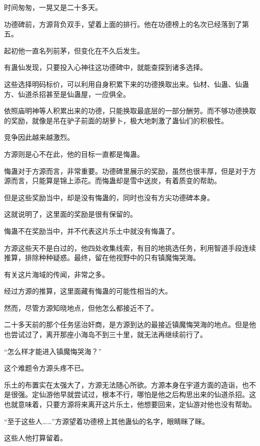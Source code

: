 
\begin{this_body}

时间匆匆，一晃又是二十多天。

功德碑前，方源背负双手，望着上面的排行。他在功德榜上的名次已经落到了第五。

起初他一直名列前茅，但变化在不久后发生。

有蛊仙发现，只要投入心神往这功德碑中，就能查探到诸多选择。

这些选择明码标价，可以利用自身积累下来的功德换取出来。仙材、仙蛊、仙蛊方、仙道杀招甚至是仙蛊屋，一应俱全。

依照庙明神等人积累出来的功德，只能换取最底层的一部分酬劳。而不够功德换取的奖励，就像是吊在驴子前面的胡萝卜，极大地刺激了蛊仙们的积极性。

竞争因此越来越激烈。

方源则是心不在此，他的目标一直都是悔蛊。

悔蛊对于方源而言，非常重要。功德碑里展示的奖励，虽然也很丰厚，但是对于方源而言，只能算是锦上添花。而悔蛊却是雪中送炭，有着质变的帮助。

但是这些奖励当中，却是没有悔蛊的，同时也没有方尖功德碑本身。

这就说明了，这里面的奖励是很有保留的。

悔蛊不在奖励当中，并不代表这片乐土中就没有悔蛊了。

方源这些天不是白过的，他四处收集线索，有目的地挑选任务，利用智道手段连续推算，排除种种疑惑。最终，留在他视野中的只有镇魔悔哭海。

有关这片海域的传闻，非常之多。

经过方源的推算，这里面藏有悔蛊的可能性相当的大。

然而，尽管方源知晓地点，但他怎么都接近不了。

二十多天前的那个任务惩治奸商，是方源到达的最接近镇魔悔哭海的地点。但是他也尝试过了，离开那座小海岛不到三十里，就无法再继续前行了。

“怎么样才能进入镇魔悔哭海？”

这个难题令方源头疼不已。

乐土的布置实在太强大了，方源无法随心所欲。方源本身在宇道方面的造诣，也不是很强。定仙游他早就尝试过，根本不行，哪怕是他之后构思出来的仙道杀招。这也就意味着，只要方源将来离开这片乐土，他想要回来，定仙游对他也没有帮助。

“至于这些人……”方源望着功德榜上其他蛊仙的名字，眼睛眯了眯。

这些人他打算留着。


\end{this_body}
